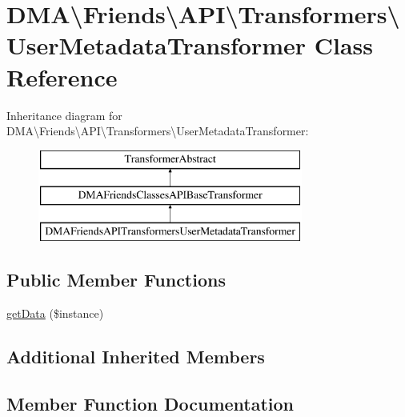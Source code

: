 \hypertarget{classDMA_1_1Friends_1_1API_1_1Transformers_1_1UserMetadataTransformer}{}\section{D\+M\+A\textbackslash{}Friends\textbackslash{}A\+P\+I\textbackslash{}Transformers\textbackslash{}User\+Metadata\+Transformer Class Reference}
\label{classDMA_1_1Friends_1_1API_1_1Transformers_1_1UserMetadataTransformer}
Inheritance diagram for D\+M\+A\textbackslash{}Friends\textbackslash{}A\+P\+I\textbackslash{}Transformers\textbackslash{}User\+Metadata\+Transformer\+:\begin{figure}[H]
\begin{center}
\leavevmode
\includegraphics[height=3.000000cm]{d6/d2d/classDMA_1_1Friends_1_1API_1_1Transformers_1_1UserMetadataTransformer}
\end{center}
\end{figure}
\subsection*{Public Member Functions}
\begin{DoxyCompactItemize}
\item 
\hyperlink{classDMA_1_1Friends_1_1API_1_1Transformers_1_1UserMetadataTransformer_ada25608c2463185d6bb056e6d289a16a}{get\+Data} (\$instance)
\end{DoxyCompactItemize}
\subsection*{Additional Inherited Members}


\subsection{Member Function Documentation}
\hypertarget{classDMA_1_1Friends_1_1API_1_1Transformers_1_1UserMetadataTransformer_ada25608c2463185d6bb056e6d289a16a}{}
